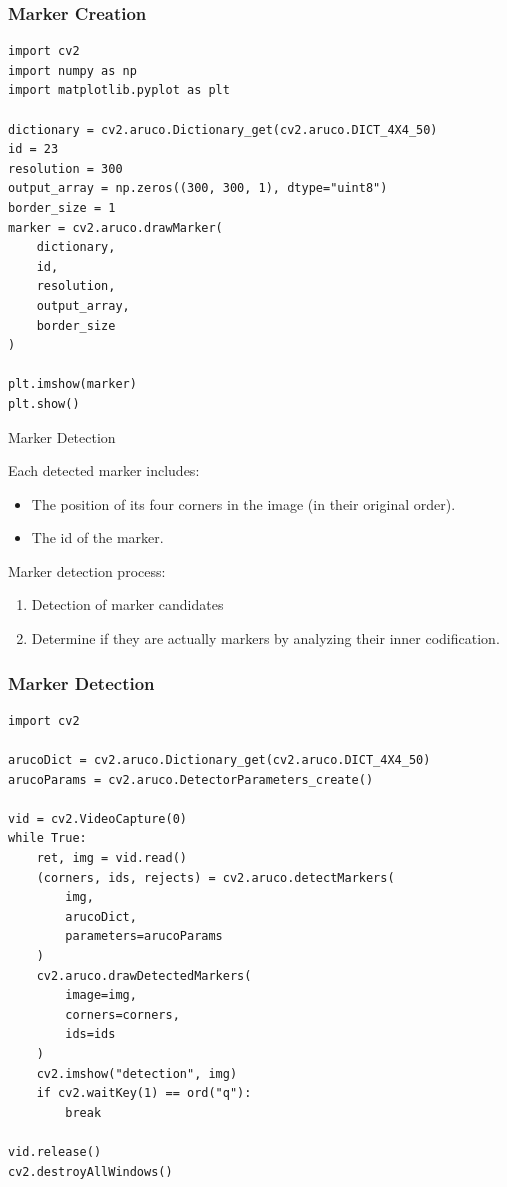 \documentclass[12pt,letterpaper]{beamer}
\begin{document}
\begin{frame}[fragile]
    \frametitle{Marker Creation}

    {\scriptsize
    \begin{verbatim}
import cv2
import numpy as np
import matplotlib.pyplot as plt

dictionary = cv2.aruco.Dictionary_get(cv2.aruco.DICT_4X4_50)
id = 23
resolution = 300
output_array = np.zeros((300, 300, 1), dtype="uint8")
border_size = 1
marker = cv2.aruco.drawMarker(
    dictionary, 
    id, 
    resolution, 
    output_array, 
    border_size
)

plt.imshow(marker)
plt.show()
    \end{verbatim}
}
\end{frame}

\begin{frame}{Marker Detection}

    Each detected marker includes:
    {\scriptsize
        \begin{itemize}
            \item The position of its four corners in the image (in their original order).
            \item The id of the marker.
        \end{itemize}
    }
    Marker detection process:
    {\scriptsize
        \begin{enumerate}
            \item Detection of marker candidates
            \item Determine if they are actually markers by analyzing their inner codification.
        \end{enumerate}
    }
\end{frame}

\begin{frame}[fragile]
    \frametitle{Marker Detection}
    \scriptsize
    \begin{verbatim}
import cv2

arucoDict = cv2.aruco.Dictionary_get(cv2.aruco.DICT_4X4_50)
arucoParams = cv2.aruco.DetectorParameters_create()

vid = cv2.VideoCapture(0)
while True:
    ret, img = vid.read()
    (corners, ids, rejects) = cv2.aruco.detectMarkers(
        img,
        arucoDict,
        parameters=arucoParams
    )
    cv2.aruco.drawDetectedMarkers(
        image=img,
        corners=corners,
        ids=ids
    )
    cv2.imshow("detection", img)
    if cv2.waitKey(1) == ord("q"):
        break

vid.release()
cv2.destroyAllWindows()
    \end{verbatim}
\end{frame}
\end{document}
